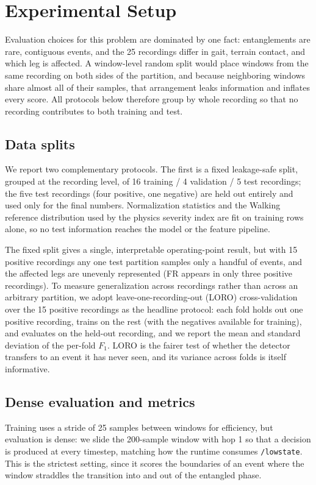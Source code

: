 \section{Experimental Setup}
Evaluation choices for this problem are dominated by one fact: entanglements are rare, contiguous events, and the 25 recordings differ in gait, terrain contact, and which leg is affected. A window-level random split would place windows from the same recording on both sides of the partition, and because neighboring windows share almost all of their samples, that arrangement leaks information and inflates every score. All protocols below therefore group by whole recording so that no recording contributes to both training and test.

\subsection{Data splits}
We report two complementary protocols. The first is a fixed leakage-safe split, grouped at the recording level, of 16 training / 4 validation / 5 test recordings; the five test recordings (four positive, one negative) are held out entirely and used only for the final numbers. Normalization statistics and the Walking reference distribution used by the physics severity index are fit on training rows alone, so no test information reaches the model or the feature pipeline.

The fixed split gives a single, interpretable operating-point result, but with 15 positive recordings any one test partition samples only a handful of events, and the affected legs are unevenly represented (FR appears in only three positive recordings). To measure generalization across recordings rather than across an arbitrary partition, we adopt leave-one-recording-out (LORO) cross-validation over the 15 positive recordings as the headline protocol: each fold holds out one positive recording, trains on the rest (with the negatives available for training), and evaluates on the held-out recording, and we report the mean and standard deviation of the per-fold $F_1$. LORO is the fairer test of whether the detector transfers to an event it has never seen, and its variance across folds is itself informative.

\subsection{Dense evaluation and metrics}
Training uses a stride of 25 samples between windows for efficiency, but evaluation is dense: we slide the 200-sample window with hop 1 so that a decision is produced at every timestep, matching how the runtime consumes \texttt{/lowstate}. This is the strictest setting, since it scores the boundaries of an event where the window straddles the transition into and out of the entangled phase.

